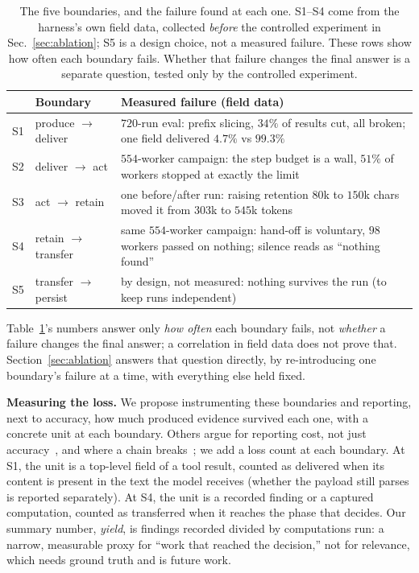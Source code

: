 \documentclass[10pt,conference]{IEEEtran}
\begin{document}
\begin{table}[t]
\caption{The five boundaries, and the failure found at each one. S1--S4
come from the harness's own field data, collected \emph{before} the
controlled experiment in Sec.~\ref{sec:ablation}; S5 is a design choice,
not a measured failure. These rows show how often each boundary fails.
Whether that failure changes the final answer is a separate question,
tested only by the controlled experiment.}
\label{tab:pipeline}
\centering\small
\begin{tabular}{@{}llp{4.0cm}@{}}
\toprule
& \textbf{Boundary} & \textbf{Measured failure (field data)} \\
\midrule
S1 & produce $\to$ deliver & $720$-run eval: prefix slicing, $34\%$ of results cut, all broken; one field delivered $4.7\%$ vs $99.3\%$ \\
S2 & deliver $\to$ act & $554$-worker campaign: the step budget is a wall, $51\%$ of workers stopped at exactly the limit \\
S3 & act $\to$ retain & one before/after run: raising retention $80$k to $150$k chars moved it from $303$k to $545$k tokens \\
S4 & retain $\to$ transfer & same $554$-worker campaign: hand-off is voluntary, $98$ workers passed on nothing; silence reads as ``nothing found'' \\
S5 & transfer $\to$ persist & by design, not measured: nothing survives the run (to keep runs independent) \\
\bottomrule
\end{tabular}
\end{table}

Table~\ref{tab:pipeline}'s numbers answer only \emph{how often} each
boundary fails, not \emph{whether} a failure changes the final answer; a
correlation in field data does not prove that. Section~\ref{sec:ablation}
answers that question directly, by re-introducing one boundary's failure
at a time, with everything else held fixed.

\textbf{Measuring the loss.} We propose instrumenting these boundaries
and reporting, next to accuracy, how much produced evidence survived
each one, with a concrete unit at each boundary. Others argue for reporting
cost, not just accuracy~\cite{kapoor2025agents}, and where a chain
breaks~\cite{zhang2026phreeqc}; we add a loss count at each boundary. At S1, the unit is a
top-level field of a tool result, counted as delivered when its content
is present in the text the model receives (whether the payload still
parses is reported separately). At S4, the unit is a recorded finding or
a captured computation, counted as transferred when it reaches the phase
that decides. Our summary number, \emph{yield}, is findings recorded
divided by computations run: a narrow, measurable proxy for ``work that
reached the decision,'' not for relevance, which needs ground truth and
is future work.
\end{document}
